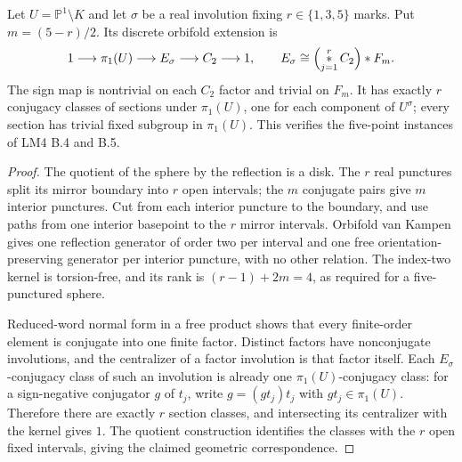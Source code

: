 Let $U=\mathbb P^1\setminus K$ and let $\sigma$ be a real involution
fixing $r\in\{1,3,5\}$ marks.  Put $m=(5-r)/2$.  Its discrete
orbifold extension is
\[
 1\longrightarrow\pi_1(U)\longrightarrow
 E_\sigma\longrightarrow C_2\longrightarrow1,
 \qquad
 E_\sigma\cong\Bigl(\mathop{*}_{j=1}^{r}C_2\Bigr)*F_m.
\]
The sign map is nontrivial on each $C_2$ factor and trivial on
$F_m$.  It has exactly $r$ conjugacy classes of sections under
$\pi_1(U)$, one for each component of $U^\sigma$; every section
has trivial fixed subgroup in $\pi_1(U)$.
This verifies the five-point instances of LM4 B.4 and B.5.
\begin{proof}
The quotient of the sphere by the reflection is a disk.  The $r$
real punctures split its mirror boundary into $r$ open intervals;
the $m$ conjugate pairs give $m$ interior punctures.  Cut from each
interior puncture to the boundary, and use paths from one interior
basepoint to the $r$ mirror intervals.  Orbifold van Kampen gives
one reflection generator of order two per interval and one free
orientation-preserving generator per interior puncture, with no
other relation.  The index-two kernel is torsion-free, and its rank
is $(r-1)+2m=4$, as required for a five-punctured sphere.

Reduced-word normal form in a free product shows that every
finite-order element is conjugate into one finite factor.  Distinct
factors have nonconjugate involutions, and the centralizer of a
factor involution is that factor itself.  Each $E_\sigma$-conjugacy
class of such an involution is already one $\pi_1(U)$-conjugacy
class: for a sign-negative conjugator $g$ of $t_j$, write
$g=(gt_j)t_j$ with $gt_j\in\pi_1(U)$.  Therefore there are exactly
$r$ section classes, and intersecting its centralizer with the
kernel gives $1$.  The quotient construction identifies the
classes with the $r$ open fixed intervals, giving the claimed
geometric correspondence.
\end{proof}

